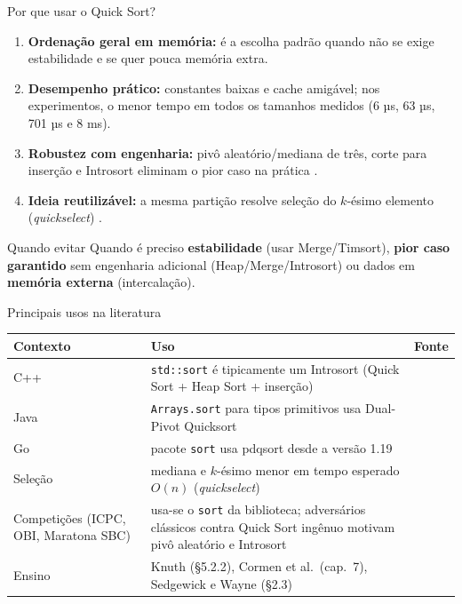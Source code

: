 \documentclass[aspectratio=169,10pt]{beamer}
\begin{document}
\begin{frame}{Por que usar o Quick Sort?}
 \begin{enumerate}
  \item \textbf{Ordenação geral em memória:} é a escolha padrão quando não se exige estabilidade e se quer pouca memória extra.
  \item \textbf{Desempenho prático:} constantes baixas e cache amigável; nos experimentos, o menor tempo em todos os tamanhos medidos (6 µs, 63 µs, 701 µs e 8 ms).
  \item \textbf{Robustez com engenharia:} pivô aleatório/mediana de três, corte para inserção e Introsort eliminam o pior caso na prática \cite{sedgewick78,musser97}.
  \item \textbf{Ideia reutilizável:} a mesma partição resolve seleção do $k$-ésimo elemento (\emph{quickselect}) \cite{hoare61find,clrs22}.
 \end{enumerate}
 \vspace{0.6em}
 \begin{alertblock}{Quando evitar}
  \footnotesize Quando é preciso \textbf{estabilidade} (usar Merge/Timsort), \textbf{pior caso garantido} sem engenharia adicional (Heap/Merge/Introsort) ou dados em \textbf{memória externa} (intercalação).
 \end{alertblock}
\end{frame}

\begin{frame}{Principais usos na literatura}
 \centering\footnotesize
 \renewcommand{\arraystretch}{1.3}
 \begin{tabular}{@{}p{2.8cm}p{4.8cm}p{3.4cm}@{}}
  \toprule
  \textbf{Contexto} & \textbf{Uso} & \textbf{Fonte}\\
  \midrule
  C++ & \texttt{std::sort} é tipicamente um Introsort (Quick Sort + Heap Sort + inserção) & \cite{musser97}\\
  Java & \texttt{Arrays.sort} para tipos primitivos usa Dual-Pivot Quicksort & \cite{wildnebel12}\\
  Go & pacote \texttt{sort} usa pdqsort desde a versão 1.19 & \cite{peters21}\\
  Seleção & mediana e $k$-ésimo menor em tempo esperado $O(n)$ (\emph{quickselect}) & \cite{hoare61find,clrs22}\\
  Competições (ICPC, OBI, Maratona SBC) & usa-se o \texttt{sort} da biblioteca; adversários clássicos contra Quick Sort ingênuo motivam pivô aleatório e Introsort & \cite{mcilroy99}\\
  Ensino & Knuth (\S5.2.2), Cormen et al.\ (cap.\ 7), Sedgewick e Wayne (\S2.3) & \cite{knuth98,clrs22,sedgewick11}\\
  \bottomrule
 \end{tabular}
\end{frame}
\end{document}
